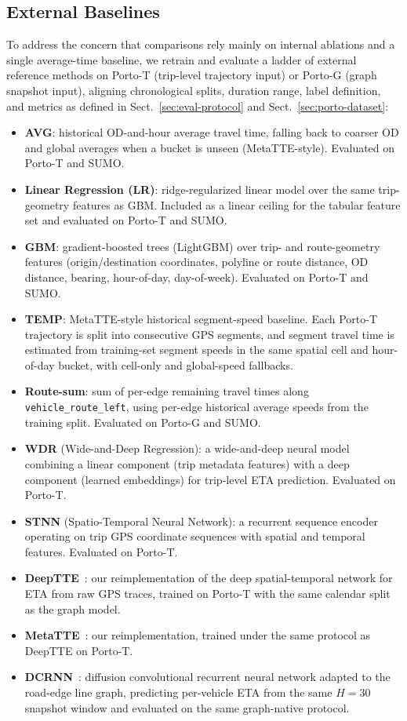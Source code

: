 \documentclass[pdflatex,sn-basic,Numbered]{sn-jnl}%
\begin{document}
\subsection{External Baselines}\label{sec:baselines}
To address the concern that comparisons rely mainly on internal ablations and a single average-time baseline, we retrain and evaluate a ladder of external reference methods on Porto-T (trip-level trajectory input) or Porto-G (graph snapshot input), aligning chronological splits, duration range, label definition, and metrics as defined in Sect.~\ref{sec:eval-protocol} and Sect.~\ref{sec:porto-dataset}:
\begin{itemize}
    \item \textbf{AVG}: historical OD-and-hour average travel time, falling back to coarser OD and global averages when a bucket is unseen (MetaTTE-style). Evaluated on Porto-T and SUMO.
    \item \textbf{Linear Regression (LR)}: ridge-regularized linear model over the same trip-geometry features as GBM. Included as a linear ceiling for the tabular feature set and evaluated on Porto-T and SUMO.
    \item \textbf{GBM}: gradient-boosted trees (LightGBM) over trip- and route-geometry features (origin/destination coordinates, polyline or route distance, OD distance, bearing, hour-of-day, day-of-week). Evaluated on Porto-T and SUMO.
    \item \textbf{TEMP}: MetaTTE-style historical segment-speed baseline. Each Porto-T trajectory is split into consecutive GPS segments, and segment travel time is estimated from training-set segment speeds in the same spatial cell and hour-of-day bucket, with cell-only and global-speed fallbacks.
    \item \textbf{Route-sum}: sum of per-edge remaining travel times along \texttt{vehicle\_route\_left}, using per-edge historical average speeds from the training split. Evaluated on Porto-G and SUMO.
    \item \textbf{WDR} (Wide-and-Deep Regression): a wide-and-deep neural model combining a linear component (trip metadata features) with a deep component (learned embeddings) for trip-level ETA prediction. Evaluated on Porto-T.
    \item \textbf{STNN} (Spatio-Temporal Neural Network): a recurrent sequence encoder operating on trip GPS coordinate sequences with spatial and temporal features. Evaluated on Porto-T.
    \item \textbf{DeepTTE}~\cite{deepTTE2018}: our reimplementation of the deep spatial-temporal network for ETA from raw GPS traces, trained on Porto-T with the same calendar split as the graph model.
    \item \textbf{MetaTTE}~\cite{wang2022metatte}: our reimplementation, trained under the same protocol as DeepTTE on Porto-T.
    \item \textbf{DCRNN}~\cite{dcrnn2018}: diffusion convolutional recurrent neural network adapted to the road-edge line graph, predicting per-vehicle ETA from the same $H{=}30$ snapshot window and evaluated on the same graph-native protocol.
\end{itemize}
\end{document}
